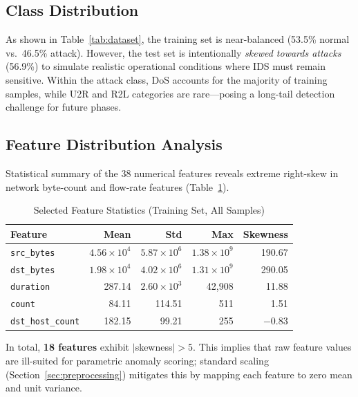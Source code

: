 \documentclass[conference]{IEEEtran}
\begin{document}
\subsection{Class Distribution}
As shown in Table~\ref{tab:dataset}, the training set is near-balanced
(53.5\% normal vs.\ 46.5\% attack).  However, the test set is intentionally
\emph{skewed towards attacks} (56.9\%) to simulate realistic operational conditions
where IDS must remain sensitive.  Within the attack class, DoS accounts for the
majority of training samples, while U2R and R2L categories are rare---posing a
long-tail detection challenge for future phases.

\subsection{Feature Distribution Analysis}
\label{ssec:feature_dist}
Statistical summary of the 38 numerical features reveals extreme right-skew
in network byte-count and flow-rate features (Table~\ref{tab:feat_stats}).

\begin{table}[H]
  \centering
  \caption{Selected Feature Statistics (Training Set, All Samples)}
  \label{tab:feat_stats}
  \begin{tabular}{lrrrr}
    \toprule
    \textbf{Feature} & \textbf{Mean} & \textbf{Std} & \textbf{Max} & \textbf{Skewness} \\
    \midrule
    \texttt{src\_bytes}       & $4.56 \times 10^{4}$ & $5.87 \times 10^{6}$ & $1.38 \times 10^{9}$ & 190.67 \\
    \texttt{dst\_bytes}       & $1.98 \times 10^{4}$ & $4.02 \times 10^{6}$ & $1.31 \times 10^{9}$ & 290.05 \\
    \texttt{duration}         & 287.14               & $2.60 \times 10^{3}$ & 42,908               & 11.88  \\
    \texttt{count}            & 84.11                & 114.51               & 511                  & 1.51   \\
    \texttt{dst\_host\_count} & 182.15               & 99.21                & 255                  & $-0.83$ \\
    \bottomrule
  \end{tabular}
\end{table}

In total, \textbf{18 features} exhibit $|$skewness$|>5$.  This implies that raw
feature values are ill-suited for parametric anomaly scoring; standard scaling
(Section~\ref{sec:preprocessing}) mitigates this by mapping each feature to zero
mean and unit variance.
\end{document}
